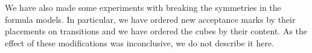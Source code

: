 \documentclass[a4paper,UKenglish,cleveref,autoref,thm-restate]{lipics-v2021}
\newcommand{\todo}[1]{\marginpar{\textcolor{red}{#1}}}
\DeclareMathOperator{\Inf}{\mathsf{Inf}}
\DeclareMathOperator{\Fin}{\mathsf{Fin}}
\newcommand{\mks}{\mathit{mks}}
\newcommand{\rem}{\mathit{nm}}
\newcommand{\mA}{\mathcal{A}}
\begin{document}
We have also made some experiments with breaking the symmetries in the
formula models. In particular, we have ordered new acceptance marks by
their placements on transitions and we have ordered the cubes by their
content. As the effect of these modifications was inconclusive, we do
not describe it here.





\end{document}
